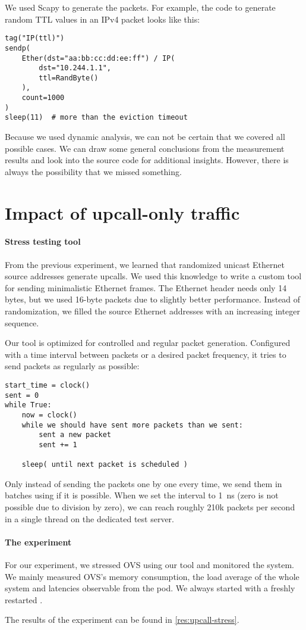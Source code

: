 We used Scapy to generate the packets. For example, the code to generate random TTL values in an IPv4 packet looks like this:


\pagebreak  %
\begin{verbatim}
tag("IP(ttl)")
sendp(
    Ether(dst="aa:bb:cc:dd:ee:ff") / IP(
        dst="10.244.1.1",
        ttl=RandByte()
    ),
    count=1000
)
sleep(11)  # more than the eviction timeout
\end{verbatim}

Because we used dynamic analysis, we can not be certain that we covered all possible cases. We can draw some general conclusions from the measurement results and look into the source code for additional insights. However, there is always the possibility that we missed something.

\section{Impact of upcall-only traffic}
\label{design:upcall-impact}

\paragraph{Stress testing tool}
From the previous experiment, we learned that randomized unicast Ethernet source addresses generate upcalls. We used this knowledge to write a custom tool for sending minimalistic Ethernet frames. The Ethernet header needs only 14 bytes, but we used 16-byte packets due to slightly better performance. Instead of randomization, we filled the source Ethernet addresses with an increasing integer sequence.

Our tool is optimized for controlled and regular packet generation. Configured with a time interval between packets or a desired packet frequency, it tries to send packets as regularly as possible:

\begin{verbatim}
start_time = clock()
sent = 0
while True:
    now = clock()
    while we should have sent more packets than we sent:
        sent a new packet
        sent += 1
    
    sleep( until next packet is scheduled )
\end{verbatim}

Only instead of sending the packets one by one every time, we send them in batches using  if it is possible. When we set the interval to \qty{1}{\ns} (zero is not possible due to division by zero), we can reach roughly 210k packets per second in a single thread on the dedicated test server.

\paragraph{The experiment}
For our experiment, we stressed OVS using our tool and monitored the system. We mainly measured OVS's memory consumption, the load average of the whole system and latencies observable from the  pod. We always started with a freshly restarted .

The results of the experiment can be found in \cref{res:upcall-stress}.